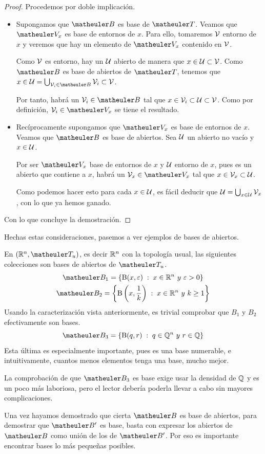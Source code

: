 \begin{proof}
	Procedemos por doble implicación.
	\begin{itemize}
		\item[\bra] Supongamos que $\B$ es base de $\T$. Veamos que $\Va{x}$ es base de entornos de $x$. Para ello, tomaremos $\mathcal{V}$ entorno de $x$ y veremos que hay un elemento de $\Va{x}$ contenido en $\mathcal{V}$.
		
		Como $\mathcal{V}$ es entorno, hay un $\mathcal{U}$ abierto de manera que $x \in \mathcal{U} \subset \mathcal{V}$. Como $\B$ es base de abiertos de $\T$, tenemos que $x \in \U = \bigcup_{\V_i \in \B} \V_i \subset \V$.
		
		Por tanto, habrá un $\V_i \in \B$ tal que $x \in \mathcal{V}_i \subset \mathcal{U} \subset \mathcal{V}$. Como por definición, $\V_i\in\Va{x}$ se tiene el resultado.
		\item[\bla] Recíprocamente supongamos que $\Va{x}$ es base de entornos de $x$. Veamos que $\B$ es base de abiertos. Sea $\mathcal{U}$ un abierto no vacío y $x \in \mathcal{U}$. 
		
		Por ser $\Va{x}$ base de entornos de $x$ y $\mathcal{U}$ entorno de $x$, pues es un abierto que contiene a $x$, habrá un $\V_x \in \Va{x}$ tal que $x \in \mathcal{V}_x \subset \mathcal{U}$.
		
		Como podemos hacer esto para cada $x \in \mathcal{U}$, es fácil deducir que $\mathcal{U} = \bigcup_{x \in \mathcal{U}} \mathcal{V}_x$, con lo que ya hemos ganado.
	\end{itemize}
	Con lo que concluye la demostración.
\end{proof}

Hechas estas consideraciones, pasemos a ver ejemplos de bases de abiertos.
\begin{exa}
	\label{etop_bases}
	En $( \R^n,\T_u )$, es decir $\mathbb{R}^n$ con la topología usual, las siguientes colecciones son bases de abiertos de $\T_u$.
 	 \begin{gather}
 	 	\B_1=\{\bola(x, \varepsilon) \midc x \in \R^n\ y \ \varepsilon > 0\}\\
 	 	\B_2=\left\{\bola\left(x, \frac{1}{k}\right) \midc x \in \R^n\ y \ k \geq 1\right\}
 	 \end{gather}
	 Usando la caracterización vista anteriormente, es trivial comprobar que $B_1$ y $B_2$ efectivamente son bases.
	 \begin{equation}
	 	\B_3=\{\bola(q, r) \midc q \in \Q^n\ y \ r \in \Q\}
	 \end{equation}
	 Esta última es especialmente importante, pues es una base numerable, e intuitivamente, cuantos menos elementos tenga una base, mucho mejor.
	 
	 La comprobación de que $\B_3$ es base exige usar la densidad de $\mathbb{Q}$ y es un poco más laboriosa, pero el lector debería poderla llevar a cabo sin mayores complicaciones.
\end{exa}
\begin{obs}
	Una vez hayamos demostrado que cierta $\B$ es base de abiertos, para demostrar que $\B'$ es base, basta con expresar los abiertos de $\B$ como unión de los de $\B'$. Por eso es importante encontrar bases lo más pequeñas posibles.  \qedhere
\end{obs}

